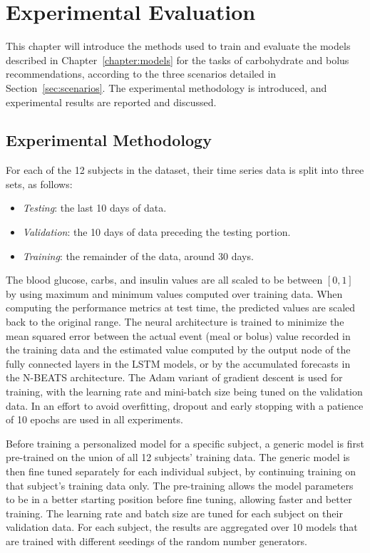 \chapter{Experimental Evaluation}
\label{chapter:methods}

This chapter will introduce the methods used to train and evaluate the models described in Chapter~\ref{chapter:models} for the tasks of carbohydrate and bolus recommendations, according to the three scenarios detailed in Section~\ref{sec:scenarios}. The experimental methodology is introduced, and experimental results are reported and discussed.

\section{Experimental Methodology}
\label{sec:methodology}

For each of the 12 subjects in the dataset, their time series data is split into three sets, as follows:
\begin{itemize}
    \item {\it Testing}: the last 10 days of data.
    \item {\it Validation}: the 10 days of data preceding the testing portion.
    \item {\it Training}: the remainder of the data, around 30 days.
\end{itemize}
The blood glucose, carbs, and insulin values are all scaled to be between $[0, 1]$ by using maximum and minimum values computed over training data. When computing the performance metrics at test time, the predicted values are scaled back to the original range.
The neural architecture is trained to minimize the mean squared error between the actual event (meal or bolus) value recorded in the training data and the estimated value computed by the output node of the fully connected layers in the \ac{LSTM} models, or by the accumulated forecasts in the \ac{N-BEATS} architecture. The Adam \cite{kingma:adam} variant of gradient descent is used for training, with the learning rate and mini-batch size being tuned on the validation data. In an effort to avoid overfitting, dropout and early stopping with a patience of 10 epochs are used in all experiments.

Before training a personalized model for a specific subject, a generic model is first pre-trained on the union of all 12 subjects' training data. The generic model is then fine tuned separately for each individual subject, by continuing training on that subject's training data only. The pre-training allows the model parameters to be in a better starting position before fine tuning, allowing faster and better training. The learning rate and batch size are tuned for each subject on their validation data. 
For each subject, the results are aggregated over 10 models that are trained with different seedings of the random number generators.

